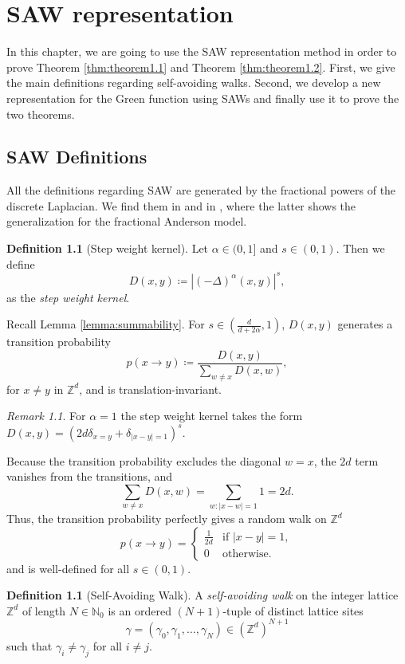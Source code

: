 \documentclass[11pt, a4paper, UKenglish, oneside]{book}
\theoremstyle{plain}
\theoremstyle{remark}
\newtheorem{remark}[theorem]{Remark}
\theoremstyle{definition}
\newtheorem{definition}[theorem]{Definition}
\numberwithin{equation}{section}
\numberwithin{theorem}{section}
\begin{document}
\clearpage
\chapter{SAW representation}\label{sec:SAW}
In this chapter, we are going to use the SAW representation method in order to prove Theorem \ref{thm:theorem1.1} and Theorem \ref{thm:theorem1.2}. First, we give the main definitions regarding self-avoiding walks. Second, we develop a new representation for the Green function using SAWs and finally use it to prove the two theorems.
\section{SAW Definitions}\label{sec:SAW.1}
All the definitions regarding SAW are generated by the fractional powers of the discrete Laplacian. We find them in \cite{madras2013self} and in \cite{disertori2024}, where the latter shows the generalization for the fractional Anderson model.
\begin{definition}[Step weight kernel]\label{def:D}
    Let $\alpha \in (0,1]$ and $s \in (0,1)$. Then we define 
    $$D(x,y) \coloneqq |(-\Delta)^\alpha(x,y)|^s,$$
    as the \textit{step weight kernel}.
\end{definition}

Recall Lemma \ref{lemma:summability}. For $s \in \left(\frac{d}{d+2\alpha},1\right)$, $D(x,y)$ generates a transition probability $$p(x \to y) \coloneqq \frac{D(x,y)}{\sum_{w \ne x} D(x,w)},$$ for $x \ne y$ in $\mathbb{Z}^d$, and is translation-invariant. 

\begin{remark}
    For $\alpha = 1$ the step weight kernel takes the form $D(x,y) = (2d \delta_{x=y} + \delta_{|x-y|=1})^s$. 
    
    Because the transition probability excludes the diagonal $w = x$, the $2d$ term vanishes from the transitions, and
    \[
        \sum_{w \ne x} D(x,w) = \sum_{w: |x-w|=1} 1 = 2d.
    \]
    Thus, the transition probability perfectly gives a  random walk on $\mathbb{Z}^d$
        \[
        p(x \to y) = 
        \begin{cases} 
            \frac{1}{2d} & \text{if } |x-y|=1, \\
            0 & \text{otherwise}.
        \end{cases}
    \]
    and is well-defined for all $s \in (0,1)$.
\end{remark}

\begin{definition}[Self-Avoiding Walk]
A \textit{self-avoiding walk} on the integer lattice $\mathbb{Z}^d$ of length $N \in \mathbb{N}_0$ is an ordered $(N+1)$-tuple of distinct lattice sites
\[
\gamma = (\gamma_0, \gamma_1, \dots, \gamma_N) \in (\mathbb{Z}^d)^{N+1}
\]
such that $\gamma_i \ne \gamma_j$ for all $i \ne j$.
\end{definition}
\end{document}
